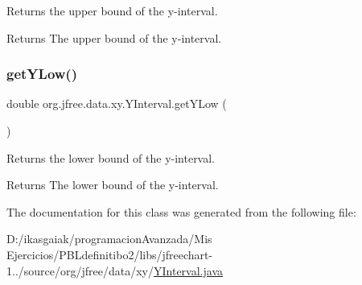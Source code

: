 Returns the upper bound of the y-\/interval.

\begin{DoxyReturn}{Returns}
The upper bound of the y-\/interval. 
\end{DoxyReturn}
\mbox{\label{classorg_1_1jfree_1_1data_1_1xy_1_1_y_interval_ad6039b36ffd92f51f3e1711ece265e11}} 
\subsubsection{\texorpdfstring{get\+Y\+Low()}{getYLow()}}
{\footnotesize\ttfamily double org.\+jfree.\+data.\+xy.\+Y\+Interval.\+get\+Y\+Low (\begin{DoxyParamCaption}{ }\end{DoxyParamCaption})}

Returns the lower bound of the y-\/interval.

\begin{DoxyReturn}{Returns}
The lower bound of the y-\/interval. 
\end{DoxyReturn}


The documentation for this class was generated from the following file\+:\begin{DoxyCompactItemize}
\item 
D\+:/ikasgaiak/programacion\+Avanzada/\+Mis Ejercicios/\+P\+B\+Ldefinitibo2/libs/jfreechart-\/1../source/org/jfree/data/xy/\mbox{\hyperlink{_y_interval_8java}{Y\+Interval.\+java}}\end{DoxyCompactItemize}
